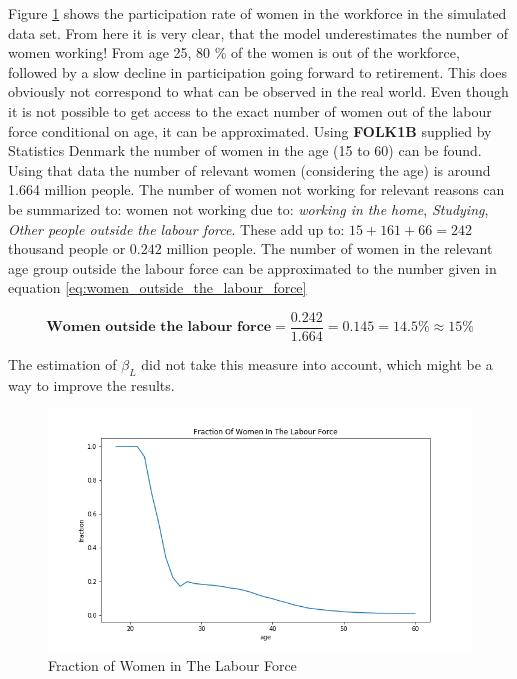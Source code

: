 Figure \ref{fig:dqi_model1_fraction_in_workforce} shows the participation rate of women in the workforce in the simulated data set. From here it is very clear, that the model underestimates the number of women working! From age 25, 80 \% of the women is out of the workforce, followed by a slow decline in participation going forward to retirement. This does obviously not correspond to what can be observed in the real world. Even though it is not possible to get access to the exact number of women out of the labour force conditional on age, it can be approximated. Using \textbf{FOLK1B} supplied by Statistics Denmark the number of women in the age (15 to 60) can be found. Using that data the number of relevant women (considering the age) is around 1.664 million people. The number of women not working for relevant reasons can be summarized to: women not working due to: \textit{working in the home}, \textit{Studying}, \textit{Other people outside the labour force}. These add up to: $15 + 161 + 66 = 242$ thousand people or $0.242$ million people. The number of women in the relevant age group outside the labour force can be approximated to the number given in equation \ref{eq:women_outside_the_labour_force}

\begin{equation}
    \label{eq:women_outside_the_labour_force}
    \textbf{Women outside the labour force} = \frac{0.242}{1.664} = 0.145 = 14.5 \% \approx 15 \%
\end{equation}

The estimation of $\beta_L$ did not take this measure into account, which might be a way to improve the results.

\begin{figure}
    \centering
    \includegraphics[scale=0.4]{figures/dqi_model1_women_in_labour_force_fraction.png}
    \caption{Fraction of Women in The Labour Force}
    \label{fig:dqi_model1_fraction_in_workforce}
\end{figure}

